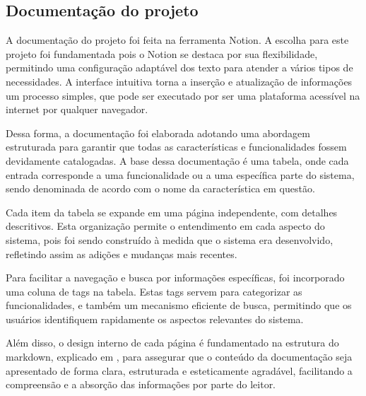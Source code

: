 


\subsection{Documentação do projeto}\label{sec:documentation}
A documentação do projeto foi feita na ferramenta Notion. A escolha para este projeto foi fundamentada pois o Notion se destaca por sua flexibilidade, permitindo uma configuração adaptável dos texto para atender a vários tipos de necessidades. A interface intuitiva torna a inserção e atualização de informações um processo simples, que pode ser executado por ser uma plataforma acessível na internet por qualquer navegador.

Dessa forma, a documentação foi elaborada adotando uma abordagem estruturada para garantir que todas as características e funcionalidades fossem devidamente catalogadas. A base dessa documentação é uma tabela, onde cada entrada corresponde a uma funcionalidade ou a uma específica parte do sistema, sendo denominada de acordo com o nome da característica em questão.

Cada item da tabela se expande em uma página independente, com detalhes descritivos. Esta organização permite o entendimento em cada aspecto do sistema, pois foi sendo construído à medida que o sistema era desenvolvido, refletindo assim as adições e mudanças mais recentes.

Para facilitar a navegação e busca por informações específicas, foi incorporado uma coluna de tags na tabela. Estas tags servem para categorizar as funcionalidades, e também um mecanismo eficiente de busca, permitindo que os usuários identifiquem rapidamente os aspectos relevantes do sistema.

Além disso, o design interno de cada página é fundamentado na estrutura do markdown, explicado em \cite{markdownguide}, para assegurar que o conteúdo da documentação seja apresentado de forma clara, estruturada e esteticamente agradável, facilitando a compreensão e a absorção das informações por parte do leitor.

